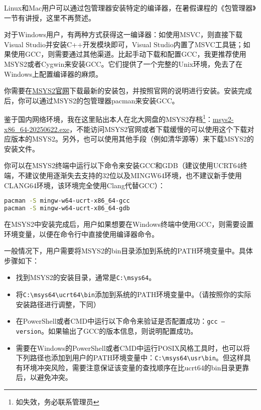 \documentclass[../main.tex]{subfiles}
\begin{document}
Linux和Mac用户可以通过包管理器安装特定的编译器，在暑假课程的《包管理器》一节有讲授，这里不再赘述。

对于Windows用户，有两种方式获得这一编译器：如使用MSVC，则直接下载Visual Studio并安装C++开发模块即可，Visual Studio内置了MSVC工具链；如果使用GCC，则需要通过其他渠道。比起手动下载和配置GCC，我更推荐使用MSYS2或者Cygwin来安装GCC。它们提供了一个完整的Unix环境，免去了在Windows上配置编译器的麻烦。

你需要在\href{https://www.msys2.org/}{MSYS2官网}下载最新的安装包，并按照官网的说明进行安装。安装完成后，你可以通过MSYS2的包管理器pacman来安装GCC。

鉴于国内网络环境，我在这里贴出本人在北大网盘的MSYS2存档\footnote{如失效，务必联系管理员}：\href{https://disk.pku.edu.cn/link/AADF534C03FA714DC982607A17BEF8A178}{msys2-x86\_64-20250622.exe}，不能访问MSYS2官网或者下载缓慢的可以使用这个下载对应版本的MSYS2。另外，也可以使用其他手段（例如清华源等）来下载MSYS2的安装文件。

你可以在MSYS2终端中运行以下命令来安装GCC和GDB（建议使用UCRT64终端，不建议使用逐渐失去支持的32位以及MINGW64环境，也不建议新手使用CLANG64环境，该环境完全使用Clang代替GCC）：

\begin{lstlisting}[language=bash]
pacman -S mingw-w64-ucrt-x86_64-gcc
pacman -S mingw-w64-ucrt-x86_64-gdb
\end{lstlisting}

在MSYS2中安装完成后，用户如果想要在Windows终端中使用GCC，则需要设置环境变量，以便在命令行中直接使用编译器命令。

一般情况下，用户需要将MSYS2的bin目录添加到系统的PATH环境变量中。具体步骤如下：

\begin{itemize}
  \item 找到MSYS2的安装目录，通常是\texttt{C:\textbackslash msys64}。
  \item 将\texttt{C:\textbackslash msys64\textbackslash ucrt64\textbackslash bin}添加到系统的PATH环境变量中。（请按照你的实际安装路径进行调整，下同）
  \item 在PowerShell或者CMD中运行以下命令来验证是否配置成功：\texttt{gcc --version}。如果输出了GCC的版本信息，则说明配置成功。
  \item 需要在Windows的PowerShell或者CMD中运行POSIX风格工具时，也可以将下列路径也添加到用户的PATH环境变量中：\texttt{C:\textbackslash msys64\textbackslash usr\textbackslash bin}。但这样具有环境冲突风险，需要注意保证该变量的查找顺序在比ucrt64的bin目录更靠后，以避免冲突。
\end{itemize}
\end{document}
